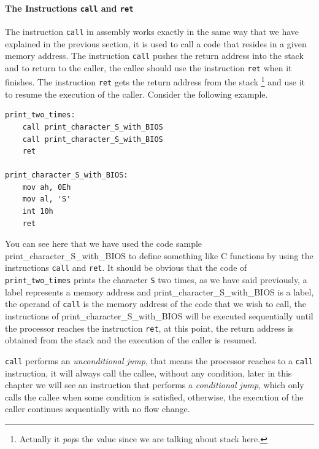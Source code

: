 \paragraph{\texorpdfstring{The Instructions \texttt{call} and
\texttt{ret}}{The Instructions call and ret}}\label{the-instructions-call-and-ret}

The instruction \lstinline!call! in assembly works exactly in the same
way that we have explained in the previous section, it is used to call a
code that resides in a given memory address. The instruction
\lstinline!call! pushes the return address into the stack and to return
to the caller, the callee should use the instruction \lstinline!ret!
when it finishes. The instruction \lstinline!ret! gets the return
address from the stack \footnote{Actually it \emph{pop}s the value since
  we are talking about stack here.} and use it to resume the execution
of the caller. Consider the following example.

\begin{lstlisting}
print_two_times:
    call print_character_S_with_BIOS
    call print_character_S_with_BIOS
    ret

print_character_S_with_BIOS:
    mov ah, 0Eh
    mov al, 'S'
    int 10h
    ret
\end{lstlisting}

You can see here that we have used the code sample
print\_character\_S\_with\_BIOS to define something like C functions by
using the instructions \lstinline!call! and \lstinline!ret!. It should
be obvious that the code of \lstinline!print_two_times! prints the
character \lstinline!S! two times, as we have said previously, a label
represents a memory address and print\_character\_S\_with\_BIOS is a
label, the operand of \lstinline!call! is the memory address of the code
that we wish to call, the instructions of
print\_character\_S\_with\_BIOS will be executed sequentially until the
processor reaches the instruction \lstinline!ret!, at this point, the
return address is obtained from the stack and the execution of the
caller is resumed.

\lstinline!call! performs an \emph{unconditional jump}, that means the
processor reaches to a \lstinline!call! instruction, it will always call
the callee, without any condition, later in this chapter we will see an
instruction that performs a \emph{conditional jump}, which only calls
the callee when some condition is satisfied, otherwise, the execution of
the caller continues sequentially with no flow change.

